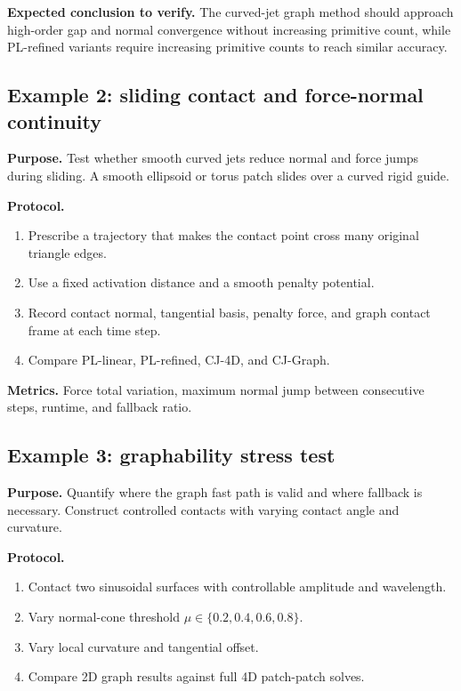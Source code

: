 \documentclass[preprint,12pt]{elsarticle}
\begin{document}
\textbf{Expected conclusion to verify.} The curved-jet graph method should approach high-order gap and normal convergence without increasing primitive count, while PL-refined variants require increasing primitive counts to reach similar accuracy.

\subsection{Example 2: sliding contact and force-normal continuity}

\textbf{Purpose.} Test whether smooth curved jets reduce normal and force jumps during sliding. A smooth ellipsoid or torus patch slides over a curved rigid guide.

\textbf{Protocol.}
\begin{enumerate}[leftmargin=*]
    \item Prescribe a trajectory that makes the contact point cross many original triangle edges.
    \item Use a fixed activation distance and a smooth penalty potential.
    \item Record contact normal, tangential basis, penalty force, and graph contact frame at each time step.
    \item Compare PL-linear, PL-refined, CJ-4D, and CJ-Graph.
\end{enumerate}

\textbf{Metrics.} Force total variation, maximum normal jump between consecutive steps, runtime, and fallback ratio.

\subsection{Example 3: graphability stress test}

\textbf{Purpose.} Quantify where the graph fast path is valid and where fallback is necessary. Construct controlled contacts with varying contact angle and curvature.

\textbf{Protocol.}
\begin{enumerate}[leftmargin=*]
    \item Contact two sinusoidal surfaces with controllable amplitude and wavelength.
    \item Vary normal-cone threshold $\mu\in\{0.2,0.4,0.6,0.8\}$.
    \item Vary local curvature and tangential offset.
    \item Compare 2D graph results against full 4D patch-patch solves.
\end{enumerate}
\end{document}
